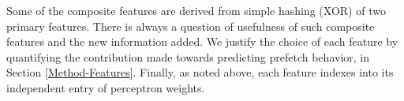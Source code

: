 \begin{itemize}

\end{itemize} 

Some of the composite features are derived from simple hashing (XOR)
of two primary features.  There is always a question of usefulness of
such composite features and the new information added.  We justify the
choice of each feature by quantifying the contribution made towards
predicting prefetch behavior, in Section \ref{Method-Features}.
Finally, as noted above, each feature indexes into its independent
entry of perceptron weights.

